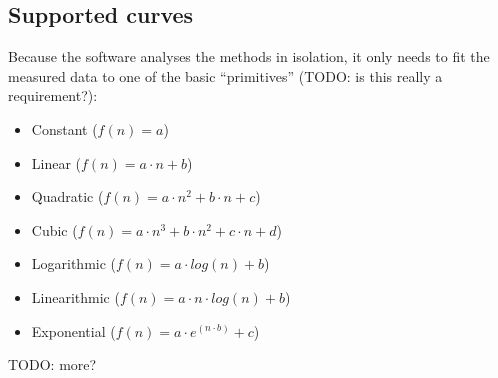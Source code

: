 \subsection{Supported curves}
Because the software analyses the methods in isolation, it only needs to fit the measured data to one of the basic \enquote{primitives} (TODO: is this really a requirement?):
\begin{itemize}
  \item Constant ($f(n) = a$)
  \item Linear ($f(n) = a \cdot n + b$)
  \item Quadratic ($f(n) = a \cdot n^2 + b \cdot n + c$)
  \item Cubic ($f(n) = a \cdot n^3 + b \cdot n^2 + c \cdot n + d$)
  \item Logarithmic ($f(n) = a \cdot log(n) + b$)
  \item Linearithmic ($f(n) = a \cdot n \cdot log(n) + b$)
  \item Exponential ($f(n) = a \cdot e^{(n \cdot b)} + c$)
\end{itemize}


\noindent TODO: more?